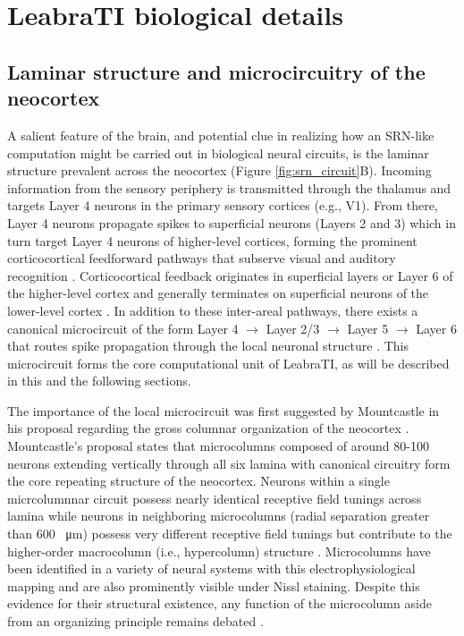 \documentclass[dwyatte_dissertation.tex]{subfiles}
\begin{document}
\section{LeabraTI biological details}

\subsection{Laminar structure and microcircuitry of the neocortex}
A salient feature of the brain, and potential clue in realizing how an SRN-like computation might be carried out in biological neural circuits, is the laminar structure prevalent across the neocortex (Figure \ref{fig:srn_circuit}B). Incoming information from the sensory periphery is transmitted through the thalamus and targets Layer 4 neurons in the primary sensory cortices (e.g., V1). From there, Layer 4 neurons propagate spikes to superficial neurons (Layers 2 and 3) which in turn target Layer 4 neurons of higher-level cortices, forming the prominent corticocortical feedforward pathways that subserve visual and auditory recognition \cite{FellemanVanEssen91}. Corticocortical feedback originates in superficial layers or Layer 6 of the higher-level cortex and generally terminates on superficial neurons of the lower-level cortex \cite{RocklandPandya79}. In addition to these inter-areal pathways, there exists a canonical microcircuit of the form Layer 4 $\rightarrow$ Layer 2/3 $\rightarrow$ Layer 5 $\rightarrow$ Layer 6 that routes spike propagation through the local neuronal structure \cite{DouglasMartin04,ThomsonLamy07,DacostaMartin10}. This microcircuit forms the core computational unit of LeabraTI, as will be described in this and the following sections.

The importance of the local microcircuit was first suggested by Mountcastle in his proposal regarding the gross columnar organization of the neocortex \cite[see][for a comprehensive review]{Mountcastle97}. Mountcastle's proposal states that microcolumns composed of around 80-100 neurons extending vertically through all six lamina with canonical circuitry form the core repeating structure of the neocortex. Neurons within a single micrcolumnnar circuit possess nearly identical receptive field tunings across lamina while neurons in neighboring microcolumns (radial separation greater than 600 \SI{}{\micro\meter}) possess very different receptive field tunings but contribute to the higher-order macrocolumn (i.e., hypercolumn) structure \cite{HubelWiesel77,Jones00}. Microcolumns have been identified in a variety of neural systems with this electrophysiological mapping and are also prominently visible under Nissl staining. Despite this evidence for their structural existence, any function of the microcolumn aside from an organizing principle remains debated \cite{BuxhoevedenCasanova02,HortonAdams05}.
\end{document}
